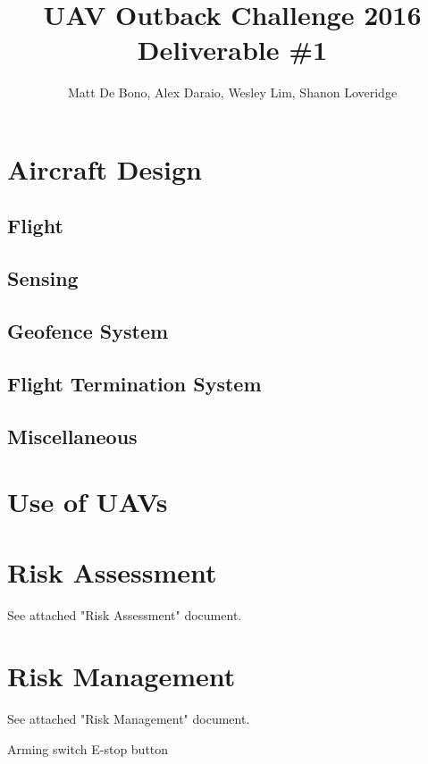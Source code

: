 \documentclass[]{article}
\title{UAV Outback Challenge 2016\\ \large Deliverable \#1\\}
\author{
	Matt De Bono,
	Alex Daraio,
	Wesley Lim,
	Shanon Loveridge}
\begin{document}
\maketitle

\section{Aircraft Design}
\subsection{Flight}


\subsection{Sensing}


\subsection{Geofence System}


\subsection{Flight Termination System}


\subsection{Miscellaneous}


\section{Use of UAVs}


\section{Risk Assessment}
See attached "Risk Assessment" document.

\section{Risk Management}
See attached "Risk Management" document.

Arming switch
E-stop button
\end{document}
